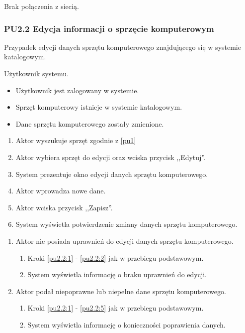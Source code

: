 Brak połączenia z siecią.



\subsubsection{PU2.2 Edycja informacji o sprzęcie komputerowym}

Przypadek edycji danych sprzętu komputerowego znajdującego się w systemie katalogowym.

Użytkownik systemu.

\begin{itemize}
\item Użytkownik jest zalogowany w systemie.
\item Sprzęt komputerowy istnieje w systemie katalogowym.
\end{itemize}

\begin{itemize}
\item Dane sprzętu komputerowego zostały zmienione.
\end{itemize}

\begin{enumerate}
\item \label{pu2.2:1} Aktor wyszukuje sprzęt zgodnie z \ref{pu1}
\item \label{pu2.2:2} Aktor wybiera sprzęt do edycji oraz wciska przycisk ,,Edytuj''.
\item System prezentuje okno edycji danych sprzętu komputerowego.
\item Aktor wprowadza nowe dane.
\item \label{pu2.2:5} Aktor wciska przycisk ,,Zapisz''.
\item System wyświetla potwierdzenie zmiany danych sprzętu komputerowego.
\end{enumerate}

\begin{enumerate}
\item Aktor nie posiada uprawnień do edycji danych sprzętu komputerowego.
	\begin{enumerate}[label*=\arabic*.]
		\item Kroki \ref{pu2.2:1} - \ref{pu2.2:2} jak w przebiegu podstawowym.
		\item System wyświetla informację o braku uprawnień do edycji.
	\end{enumerate}
\item Aktor podał niepoprawne lub niepełne dane sprzętu komputerowego.
	\begin{enumerate}[label*=\arabic*.]
		\item Kroki \ref{pu2.2:1} - \ref{pu2.2:5} jak w przebiegu podstawowym.
		\item System wyświetla informację o konieczności poprawienia danych.
	\end{enumerate}
\end{enumerate}

